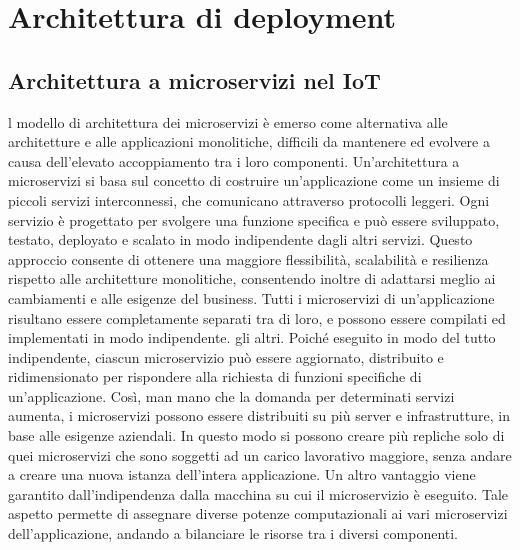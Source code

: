 \section{Architettura di deployment}
\begin{comment}
    L'architettura di deployment, detta anche "architettura di rilascio", rappresenta la struttura e la configurazione di un sistema software in fase di esecuzione. Essa definisce come i componenti software, i dati e le risorse di rete sono distribuiti e interconnessi nell'ambiente di produzione.
\end{comment}


\subsection{Architettura a microservizi nel IoT}
l modello di architettura dei microservizi è emerso come alternativa alle architetture e alle applicazioni monolitiche, difficili da mantenere ed evolvere a causa dell'elevato accoppiamento tra i loro componenti. Un'architettura a microservizi si basa sul concetto di costruire un'applicazione come un insieme di piccoli servizi interconnessi, che comunicano attraverso protocolli leggeri. Ogni servizio è progettato per svolgere una funzione specifica e può essere sviluppato, testato, deployato e scalato in modo indipendente dagli altri servizi. Questo approccio consente di ottenere una maggiore flessibilità, scalabilità e resilienza rispetto alle architetture monolitiche, consentendo inoltre di adattarsi meglio ai cambiamenti e alle esigenze del business.
Tutti i microservizi di un’applicazione risultano essere completamente separati
tra di loro, e possono essere compilati ed implementati in modo indipendente.
gli altri.
Poiché eseguito in modo del tutto indipendente, ciascun microservizio può essere
aggiornato, distribuito e ridimensionato per rispondere alla richiesta di funzioni
specifiche di un’applicazione. Così, man mano che la domanda per determinati
servizi aumenta, i microservizi possono essere distribuiti su più server e infrastrutture, in base alle esigenze aziendali. In questo modo si possono creare più repliche
solo di quei microservizi che sono soggetti ad un carico lavorativo maggiore, senza
andare a creare una nuova istanza dell’intera applicazione.
Un altro vantaggio viene garantito dall’indipendenza dalla macchina su cui
il microservizio è eseguito. Tale aspetto permette di assegnare diverse potenze
computazionali ai vari microservizi dell’applicazione, andando a bilanciare le risorse
tra i diversi componenti.


